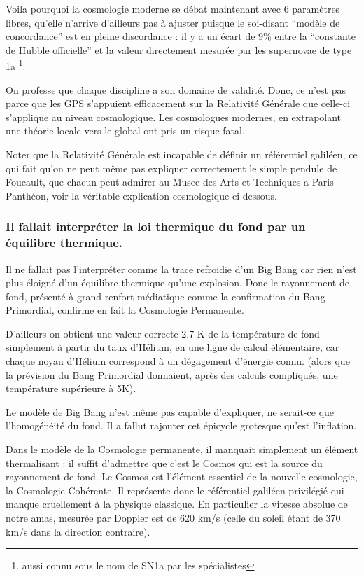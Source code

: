 \documentclass[a4paper,12pt]{article}
\begin{document}
Voila pourquoi la cosmologie moderne se débat maintenant avec 6 paramètres libres, qu'elle n'arrive d'ailleurs pas à ajuster puisque le soi-disant ``modèle de concordance'' est en pleine discordance : il y a un écart de 9\% entre la ``constante de Hubble officielle'' et la valeur directement mesurée par les supernovae de type 1a \footnote{aussi connu sous le nom de SN1a par les spécialistes}.


    On professe que chaque discipline a son domaine de validité. Donc, ce n'est pas parce que les GPS s'appuient efficacement sur la Relativité Générale que celle-ci s'applique au niveau cosmologique. Les cosmologues modernes, en extrapolant une théorie locale vers le global ont pris un risque fatal. 

Noter que la Relativité Générale est incapable de définir un référentiel galiléen, ce qui fait qu'on ne peut m\^eme pas expliquer correctement le simple pendule de Foucault, que chacun peut admirer au Musee des Arts et Techniques a Paris Panthéon, voir la véritable explication cosmologique ci-dessous.

    
\subsubsection{Il fallait interpréter la loi thermique du fond par un équilibre thermique.}


Il ne fallait pas l’interpréter comme la trace refroidie d'un Big Bang car rien n'est plus éloigné d'un équilibre thermique qu'une explosion. Donc le rayonnement de fond, présenté à grand renfort médiatique comme la confirmation du Bang Primordial, confirme en fait la Cosmologie Permanente. 


D'ailleurs on obtient une valeur correcte 2.7 K de la température de fond simplement à partir du taux d'Hélium, en une ligne de calcul élémentaire, car chaque noyau d'Hélium correspond à un dégagement d'énergie connu. (alors que la prévision du Bang Primordial donnaient, après des calculs compliqués, une température supérieure à 5K).  


Le modèle de Big Bang n’est m\^eme pas capable d’expliquer, ne serait-ce que l'homogénéité du fond.  Il a fallut rajouter cet épicycle grotesque qu'est l'inflation. 


    Dans le modèle de la Cosmologie permanente, il manquait simplement un élément thermalisant : il suffit d'admettre que c'est le Cosmos qui est la source du rayonnement de fond. Le Cosmos est l'élément essentiel de la nouvelle cosmologie, la Cosmologie Cohérente. Il représente donc le référentiel galiléen privilégié qui manque cruellement à la physique classique. En particulier la vitesse absolue de notre amas, mesurée par Doppler est de 620 km/s (celle du soleil étant de 370 km/s dans la direction contraire).
\end{document}
